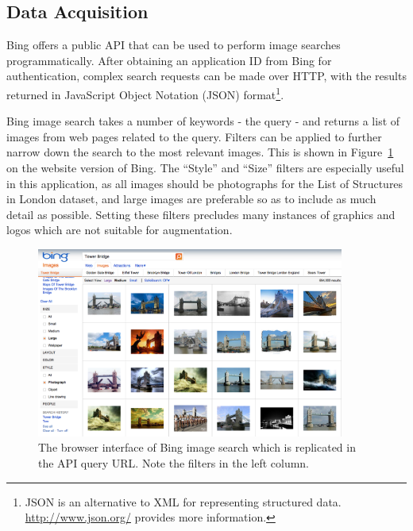 \documentclass[11pt, onecolumn, a4paper, final]{report} %
\begin{document}
\subsection{Data Acquisition}

Bing offers a public API that can be used to perform image searches programmatically. After obtaining an application ID from Bing for authentication, complex search requests can be made over HTTP, with the results returned in JavaScript Object Notation (JSON) format\footnote{JSON is an alternative to XML for representing structured data. \url{http://www.json.org/} provides more information.}.

Bing image search takes a number of keywords - the query - and returns a list of images from web pages related to the query. Filters can be applied to further narrow down the search to the most relevant images. This is shown in Figure~\ref{fig:bingimages} on the website version of Bing. The ``Style'' and ``Size'' filters are especially useful in this application, as all images should be photographs for the List of Structures in London dataset, and large images are preferable so as to include as much detail as possible. Setting these filters precludes many instances of graphics and logos which are not suitable for augmentation.

\begin{figure}[htb]
\centering 
\includegraphics[width=0.9\textwidth]{images/bing-images.png}
\caption{The browser interface of Bing image search which is replicated in the API query URL. Note the filters in the left column.}
\label{fig:bingimages}
\end{figure}
\end{document}
